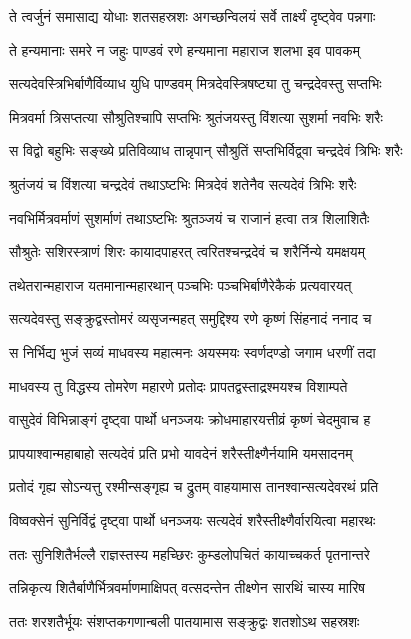 \twolineshloka
{ते त्वर्जुनं समासाद्य योधाः शतसहस्रशः}
{अगच्छन्विलयं सर्वे तार्क्ष्यं दृष्ट्वेव पन्नगाः}


\twolineshloka
{ते हन्यमानाः समरे न जहुः पाण्डवं रणे}
{हन्यमाना महाराज शलभा इव पावकम्}


\twolineshloka
{सत्यदेवस्त्रिभिर्बाणैर्विव्याध युधि पाण्डवम्}
{मित्रदेवस्त्रिषष्ट्या तु चन्द्रदेवस्तु सप्तभिः}


\twolineshloka
{मित्रवर्मा त्रिसप्तत्या सौश्रुतिश्चापि सप्तभिः}
{श्रुतंजयस्तु विंशत्या सुशर्मा नवभिः शरैः}


\twolineshloka
{स विद्वो बहुभिः सङ्ख्ये प्रतिविव्याध तान्नृपान्}
{सौश्रुतिं सप्तभिर्विद्व्वा चन्द्रदेवं त्रिभिः शरैः}


\twolineshloka
{श्रुतंजयं च विंशत्या चन्द्रदेवं तथाऽष्टभिः}
{मित्रदेवं शतेनैव सत्यदेवं त्रिभिः शरैः}


\twolineshloka
{नवभिर्मित्रवर्माणं सुशर्माणं तथाऽष्टभिः}
{श्रुतञ्जयं च राजानं हत्वा तत्र शिलाशितैः}


\twolineshloka
{सौश्रुतेः सशिरस्त्राणं शिरः कायादपाहरत्}
{त्वरितश्चन्द्रदेवं च शरैर्निन्ये यमक्षयम्}


\twolineshloka
{तथेतरान्महाराज यतमानान्महारथान्}
{पञ्चभिः पञ्चभिर्बाणैरेकैकं प्रत्यवारयत्}


\twolineshloka
{सत्यदेवस्तु सङ्क्रुद्वस्तोमरं व्यसृजन्महत्}
{समुद्दिश्य रणे कृष्णं सिंहनादं ननाद च}


\twolineshloka
{स निर्भिद्य भुजं सव्यं माधवस्य महात्मनः}
{अयस्मयः स्वर्णदण्डो जगाम धरणीं तदा}


\twolineshloka
{माधवस्य तु विद्धस्य तोमरेण महारणे}
{प्रतोदः प्रापतद्वस्ताद्रश्मयश्च विशाम्पते}


\twolineshloka
{वासुदेवं विभिन्नाङ्गं दृष्ट्वा पार्थो धनञ्जयः}
{क्रोधमाहारयत्तीव्रं कृष्णं चेदमुवाच ह}


\twolineshloka
{प्रापयाश्वान्महाबाहो सत्यदेवं प्रति प्रभो}
{यावदेनं शरैस्तीक्ष्णैर्नयामि यमसादनम्}


\twolineshloka
{प्रतोदं गृह्य सोऽन्यत्तु रश्मीन्सङ्गृह्य च द्रुतम्}
{वाहयामास तानश्वान्सत्यदेवरथं प्रति}


\twolineshloka
{विष्वक्सेनं सुनिर्विद्वं दृष्ट्वा पार्थो धनञ्जयः}
{सत्यदेवं शरैस्तीक्ष्णैर्वारयित्वा महारथः}


\twolineshloka
{ततः सुनिशितैर्भल्लै राज्ञस्तस्य महच्छिरः}
{कुम्डलोपचितं कायाच्चकर्त पृतनान्तरे}


\twolineshloka
{तन्निकृत्य शितैर्बाणैर्भित्रवर्माणमाक्षिपत्}
{वत्सदन्तेन तीक्ष्णेन सारथिं चास्य मारिष}


\twolineshloka
{ततः शरशतैर्भूयः संशप्तकगणान्बली}
{पातयामास सङ्क्रुद्वः शतशोऽथ सहस्रशः}


